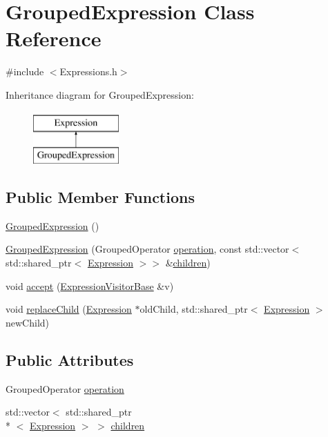 \hypertarget{class_grouped_expression}{\section{Grouped\+Expression Class Reference}
\label{class_grouped_expression}
}


{\ttfamily \#include $<$Expressions.\+h$>$}

Inheritance diagram for Grouped\+Expression\+:\begin{figure}[H]
\begin{center}
\leavevmode
\includegraphics[height=2.000000cm]{class_grouped_expression}
\end{center}
\end{figure}
\subsection*{Public Member Functions}
\begin{DoxyCompactItemize}
\item 
\hyperlink{class_grouped_expression_a7949fd699c0711a9fcad09504193ebf2}{Grouped\+Expression} ()
\item 
\hyperlink{class_grouped_expression_a986d27a72d99ad866ad0d24241795a80}{Grouped\+Expression} (Grouped\+Operator \hyperlink{class_grouped_expression_a018f4f129a3b9b0be45c8ed10ff21813}{operation}, const std\+::vector$<$ std\+::shared\+\_\+ptr$<$ \hyperlink{class_expression}{Expression} $>$$>$ \&\hyperlink{class_grouped_expression_aabace43c5af51a0e913ff9033b71295c}{children})
\item 
void \hyperlink{class_grouped_expression_a67963e289263b9c2cbf03edad83401b7}{accept} (\hyperlink{class_expression_visitor_base}{Expression\+Visitor\+Base} \&v)
\item 
void \hyperlink{class_grouped_expression_af1cb9044417df12361b6335962b3bc6c}{replace\+Child} (\hyperlink{class_expression}{Expression} $\ast$old\+Child, std\+::shared\+\_\+ptr$<$ \hyperlink{class_expression}{Expression} $>$ new\+Child)
\end{DoxyCompactItemize}
\subsection*{Public Attributes}
\begin{DoxyCompactItemize}
\item 
Grouped\+Operator \hyperlink{class_grouped_expression_a018f4f129a3b9b0be45c8ed10ff21813}{operation}
\item 
std\+::vector$<$ std\+::shared\+\_\+ptr\\*
$<$ \hyperlink{class_expression}{Expression} $>$ $>$ \hyperlink{class_grouped_expression_aabace43c5af51a0e913ff9033b71295c}{children}
\end{DoxyCompactItemize}
